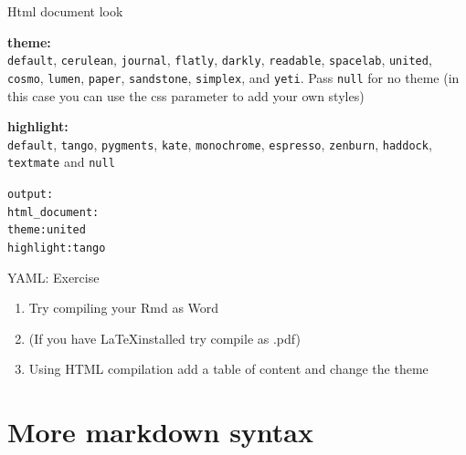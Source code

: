 \documentclass[10pt]{beamer}\usepackage[]{graphicx}\usepackage[]{color}
\makeatletter
\newcommand{\hlopt}[1]{\textcolor[rgb]{0,0,0}{#1}}%
\newcommand{\hlstd}[1]{\textcolor[rgb]{0.345,0.345,0.345}{#1}}%
\newenvironment{kframe}{%
 \def\at@end@of@kframe{}%
 \ifinner\ifhmode%
  \def\at@end@of@kframe{\end{minipage}}%
  \begin{minipage}{\columnwidth}%
 \fi\fi%
 \def\FrameCommand##1{\hskip\@totalleftmargin \hskip-\fboxsep
 \colorbox{shadecolor}{##1}\hskip-\fboxsep
     \hskip-\linewidth \hskip-\@totalleftmargin \hskip\columnwidth}%
 \MakeFramed {\advance\hsize-\width
   \@totalleftmargin\z@ \linewidth\hsize
   \@setminipage}}%
 {\par\unskip\endMakeFramed%
 \at@end@of@kframe}
\newenvironment{knitrout}{}{} %
\makeatother
\begin{document}
\begin{frame}[fragile]{Html document look}

\textbf{theme:\\}
\texttt{default}, \texttt{cerulean}, \texttt{journal}, \texttt{flatly}, \texttt{darkly}, \texttt{readable}, \texttt{spacelab}, \texttt{united}, \texttt{cosmo}, \texttt{lumen}, \texttt{paper}, \texttt{sandstone}, \texttt{simplex}, and \texttt{yeti}. Pass \texttt{null} for no theme (in this case you can use the css parameter to add your own styles)

\pause

\textbf{highlight:\\}
\texttt{default}, \texttt{tango}, \texttt{pygments}, \texttt{kate}, \texttt{monochrome}, \texttt{espresso}, \texttt{zenburn}, \texttt{haddock}, \texttt{textmate} and \texttt{null}

\pause
\begin{knitrout}\small
{}\color{fgcolor}\begin{kframe}
\begin{alltt}
\hlstd{output}\hlopt{:}
  \hlstd{html_document}\hlopt{:}
    \hlstd{theme}\hlopt{:} \hlstd{united}
    \hlstd{highlight}\hlopt{:} \hlstd{tango}
\end{alltt}
\end{kframe}
\end{knitrout}

\end{frame}

\begin{frame}{YAML: Exercise}
  \begin{enumerate}
    \item Try compiling your Rmd as Word
    \item (If you have \LaTeX installed try compile as .pdf)
    \item Using HTML compilation add a table of content and change the theme
  \end{enumerate}
\end{frame}

\section{More markdown syntax}
\end{document}
